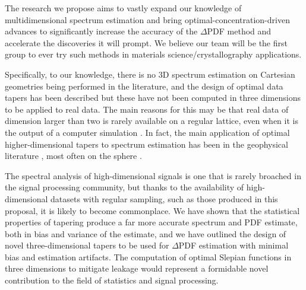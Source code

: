 


The research we propose aims to vastly expand our knowledge of multidimensional
spectrum estimation and bring optimal-concentration-driven advances to significantly
increase the accuracy of the $\Delta$PDF method and accelerate the discoveries it
will prompt. We believe our team will be the first group to ever try such methods in
materials science/crystallography applications. 

Specifically, to our knowledge, there is no 3D spectrum estimation on Cartesian
geometries being performed in the literature, and the design of optimal data tapers
has been described \cite{slepian1964,simons2011,hoganlakey} but these have not been
computed in three dimensions to be applied to real data.  The main reasons for this
may be that real data of dimension larger than two is rarely available on a regular
lattice, even when it is the output of a computer simulation \cite{geoga2018}.  In
fact, the main application of optimal higher-dimensional tapers to spectrum
estimation has been in the geophysical literature \cite{kirby2014}, most often on the
sphere \cite{simons2011}. 

The spectral analysis of high-dimensional signals is one that is rarely broached in
the signal processing community, but thanks to the availability of high-dimensional
datasets with regular sampling, such as those produced in this proposal, it is likely
to become commonplace. We have shown that the statistical properties of tapering
produce a far more accurate spectrum and PDF estimate, both in bias and variance of
the estimate, and we have outlined the design of novel three-dimensional tapers to be
used for $\Delta$PDF estimation with minimal bias and estimation artifacts. The
computation of optimal Slepian functions in three dimensions to mitigate leakage
would represent a formidable novel contribution to the field of statistics and signal
processing. 

